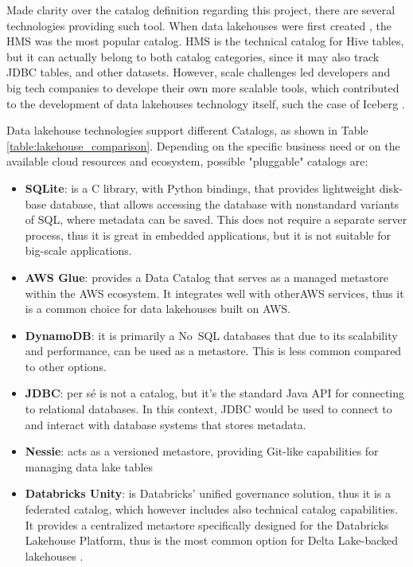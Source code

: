 Made clarity over the catalog definition regarding this project, there are several technologies providing such tool. When data lakehouses were first created \cite{rajaperumalUberEngineeringIncremental2017,shiranApacheIcebergDefinitive2024}, the \gls{HMS} was the most popular catalog. \gls{HMS} is the technical catalog for Hive tables, but it can actually belong to both catalog categories, since it may also track \gls{JDBC} tables, and other datasets. However, scale challenges led developers and big tech companies to develope their own more scalable tools, which contributed to the development of data lakehouses technology itself, such the case of Iceberg \cite{IcebergNewHadoop}.

Data lakehouse technologies support different Catalogs, as shown in Table \ref{table:lakehouse_comparison}. Depending on the specific business need or on the available cloud resources and ecosystem, possible "pluggable" catalogs are:
\begin{itemize}
    \item \textbf{SQLite}: is a C library, with Python bindings, that provides lightweight disk-base database, that allows accessing the database with nonstandard variants of \gls{SQL}, where metadata can be saved. This does not require a separate server process, thus it is great in embedded applications, but it is not suitable for big-scale applications.
    \item \textbf{\gls{AWS} Glue}: provides a Data Catalog that serves as a managed metastore within the \gls{AWS} ecosystem. It integrates well with other\gls{AWS} services, thus it is a common choice for data lakehouses built on \gls{AWS}.
    \item \textbf{DynamoDB}: it is primarily a No~\gls{SQL} databases that due to its scalability and performance, can be used as a metastore. This is less common compared to other options.
    \item \textbf{\gls{JDBC}}: per sé is not a catalog, but it's the standard Java \gls{API} for connecting to relational databases. In this context, \gls{JDBC} would be used to connect to and interact with database systems that stores metadata.
    \item \textbf{Nessie}: acts as a versioned metastore, providing Git-like capabilities for managing data lake tables
    \item \textbf{Databricks Unity}: is Databricks' unified governance solution, thus it is a federated catalog, which however includes also technical catalog capabilities. It provides a centralized metastore specifically designed for the Databricks Lakehouse Platform, thus is the most common option for Delta Lake-backed lakehouses \cite{AnnouncingDeltaLake2023}.
\end{itemize}

